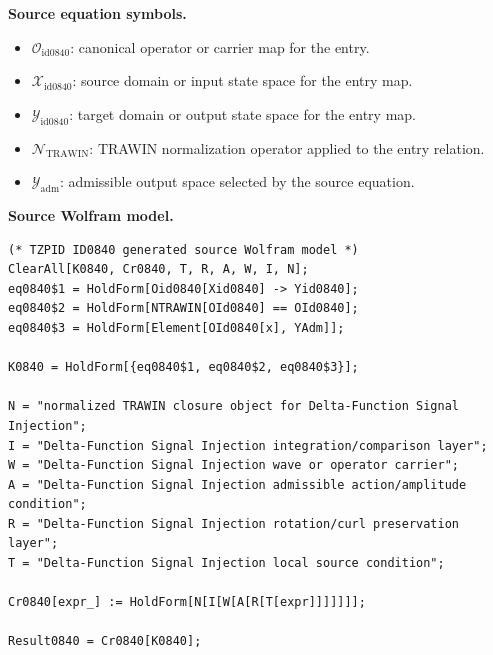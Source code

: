 \begin{minipage}[t]{0.49\linewidth}
\begingroup
\small
\raggedright
\textbf{Source equation symbols.}\par
\begin{itemize}[leftmargin=1.35em,itemsep=1pt,topsep=1pt,parsep=0pt]
    \item $\mathcal{O}_{\mathrm{id0840}}$: canonical operator or carrier map for the entry.
    \item $\mathcal{X}_{\mathrm{id0840}}$: source domain or input state space for the entry map.
    \item $\mathcal{Y}_{\mathrm{id0840}}$: target domain or output state space for the entry map.
    \item $\mathcal{N}_{\mathrm{TRAWIN}}$: TRAWIN normalization operator applied to the entry relation.
    \item $\mathcal{Y}_{\mathrm{adm}}$: admissible output space selected by the source equation.
\end{itemize}
\endgroup
\end{minipage}\hfill
\begin{minipage}[t]{0.47\linewidth}
\begingroup
\scriptsize
\raggedright
\textbf{Source Wolfram model.}\par
\begin{Verbatim}[fontsize=\tiny,breaklines=true,breakanywhere=true]
(* TZPID ID0840 generated source Wolfram model *)
ClearAll[K0840, Cr0840, T, R, A, W, I, N];
eq0840$1 = HoldForm[Oid0840[Xid0840] -> Yid0840];
eq0840$2 = HoldForm[NTRAWIN[OId0840] == OId0840];
eq0840$3 = HoldForm[Element[OId0840[x], YAdm]];

K0840 = HoldForm[{eq0840$1, eq0840$2, eq0840$3}];

N = "normalized TRAWIN closure object for Delta-Function Signal Injection";
I = "Delta-Function Signal Injection integration/comparison layer";
W = "Delta-Function Signal Injection wave or operator carrier";
A = "Delta-Function Signal Injection admissible action/amplitude condition";
R = "Delta-Function Signal Injection rotation/curl preservation layer";
T = "Delta-Function Signal Injection local source condition";

Cr0840[expr_] := HoldForm[N[I[W[A[R[T[expr]]]]]]];

Result0840 = Cr0840[K0840];
\end{Verbatim}
\endgroup
\end{minipage}

